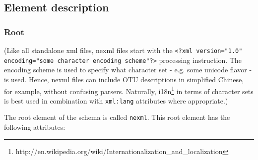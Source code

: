 \documentclass{article}
\newcommand{\code}{\texttt}
\begin{document}
\subsection{Element description}

\subsubsection{Root}

(Like all standalone xml files, nexml files start with the \code{<?xml version="1.0" encoding="some character encoding scheme"?>}
processing instruction. The encoding scheme is used to specify what character set - e.g. some unicode flavor - is used. Hence, nexml files can include OTU descriptions in simplified Chinese, 
for example, without confusing parsers. Naturally,
i18n\footnote{http://en.wikipedia.org/wiki/Internationalization\_and\_localization}
in terms of character sets is best used in combination with
\code{xml:lang} attributes where appropriate.)

The root element of the schema is called \code{nexml}. This root element
has the following attributes:
\end{document}
